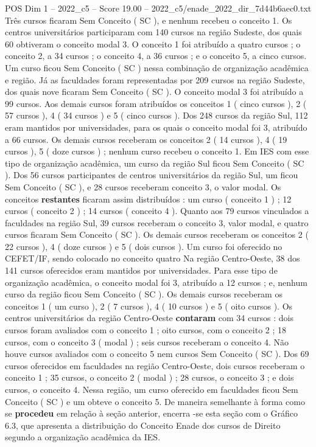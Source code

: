\begin{textsample}{POS Dim 1 – 2022\_c5 – Score 19.00 – 2022\_c5/enade\_2022\_dir\_7d44b6aec0.txt}
Três cursos ficaram Sem Conceito ( SC ), e nenhum recebeu o conceito 1.
Os centros universitários participaram com 140 cursos na região Sudeste, dos quais 60 obtiveram o conceito modal 3.
O conceito 1 foi atribuído a quatro cursos ; o conceito 2, a 34 cursos ; o conceito 4, a 36 cursos ; e o conceito 5, a cinco cursos.
Um curso ficou Sem Conceito ( SC ) nessa combinação de organização acadêmica e região.
Já as faculdades foram representadas por 209 cursos na região Sudeste, dos quais nove ficaram Sem Conceito ( SC ).
O conceito modal 3 foi atribuído a 99 cursos.
Aos demais cursos foram atribuídos os conceitos 1 ( cinco cursos ), 2 ( 57 cursos ), 4 ( 34 cursos ) e 5 ( cinco cursos ).
Dos 248 cursos da região Sul, 112 eram mantidos por universidades, para os quais o conceito modal foi 3, atribuído a 66 cursos.
Os demais cursos receberam os conceitos 2 ( 14 cursos ), 4 ( 19 cursos ), 5 ( doze cursos ) ; nenhum curso recebeu o conceito 1.
Em IES com esse tipo de organização acadêmica, um curso da região Sul ficou Sem Conceito ( SC ).
Dos 56 cursos participantes de centros universitários da região Sul, um ficou Sem Conceito ( SC ), e 28 cursos receberam conceito 3, o valor modal.
Os conceitos \textbf{restantes} ficaram assim distribuídos : um curso ( conceito 1 ) ; 12 cursos ( conceito 2 ) ; 14 cursos ( conceito 4 ).
Quanto aos 79 cursos vinculados a faculdades na região Sul, 39 cursos receberam o conceito 3, valor modal, e quatro cursos ficaram Sem Conceito ( SC ).
Os demais cursos receberam os conceitos 2 ( 22 cursos ), 4 ( doze cursos ) e 5 ( dois cursos ).
Um curso foi oferecido no CEFET/IF, sendo colocado no conceito quatro Na região Centro-Oeste, 38 dos 141 cursos oferecidos eram mantidos por universidades.
Para esse tipo de organização acadêmica, o conceito modal foi 3, atribuído a 12 cursos ; e, nenhum curso da região ficou Sem Conceito ( SC ).
Os demais cursos receberam os conceitos 1 ( um curso ), 2 ( 7 cursos ), 4 ( 10 cursos ) e 5 ( oito cursos ).
Os centros universitários da região Centro-Oeste \textbf{contaram} com 34 cursos : dois cursos foram avaliados com o conceito 1 ; oito cursos, com o conceito 2 ; 18 cursos, com o conceito 3 ( modal ) ; seis cursos receberam o conceito 4.
Não houve cursos avaliados com o conceito 5 nem cursos Sem Conceito ( SC ).
Dos 69 cursos oferecidos em faculdades na região Centro-Oeste, dois cursos receberam o conceito 1 ; 35 cursos, o conceito 2 ( modal ) ; 28 cursos, o conceito 3 ; e dois cursos, o conceito 4.
Nessa região, um curso oferecido em faculdades ficou Sem Conceito ( SC ) e um obteve o conceito 5.
De maneira semelhante à forma como se \textbf{procedeu} em relação à seção anterior, encerra -se esta seção com o Gráfico 6.3, que apresenta a distribuição do Conceito Enade dos cursos de Direito segundo a organização acadêmica da IES.

\end{textsample}
